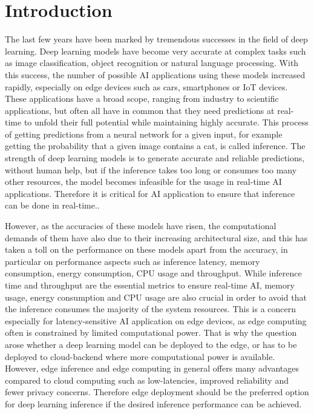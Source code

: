 \chapter{Introduction}


The last few years have been marked by tremendous successes in the field of deep learning.
Deep learning models have become very accurate at complex tasks such as image classification, object recognition or natural language processing. 
With this success, the number of possible AI applications using these models increased rapidly, especially on edge devices such as cars, smartphones or IoT devices.
These applications have a broad scope, ranging from industry to scientific applications, but often all have in common that they need predictions at real-time to unfold their full potential while maintaining highly accurate.
This process of getting predictions from a neural network for a given input, for example getting the probability that a given image contains a cat, is called inference.
The strength of deep learning models is to generate accurate and reliable predictions, without human help, but if the inference takes too long or consumes too many other resources, the model becomes infeasible for the usage in real-time AI applications.
Therefore it is critical for AI application to ensure that inference can be done in real-time..

However, as the accuracies of these models have risen, the computational demands of them have also due to their increasing architectural size, and this has taken a toll on the performance on these models apart from the accuracy, in particular on performance aspects such as inference latency, memory consumption, energy consumption, CPU usage and throughput. 
While inference time and throughput are the essential metrics to ensure real-time AI, memory usage, energy consumption and CPU usage are also crucial in order to avoid that the inference consumes the majority of the system resources.
This is a concern especially for latency-sensitive AI application on edge devices, as edge computing often is constrained by limited computational power. 
That is why the question arose whether a deep learning model can be deployed to the edge, or has to be deployed to cloud-backend where more computational power is available.
However, edge inference and edge computing in general offers many advantages compared to cloud computing such as low-latencies, improved reliability and fewer privacy concerns\cite{Mor:2018:EC:3305263.3313377}.
Therefore edge deployment should be the preferred option for deep learning inference if the desired inference performance can be achieved.


